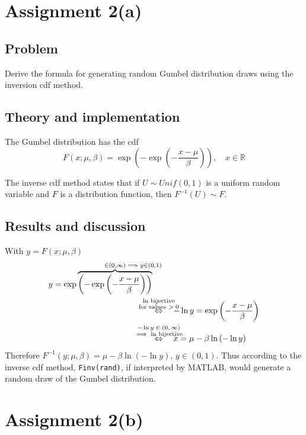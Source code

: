 \documentclass[11pt, a4paper]{article}
\begin{document}

\section{Assignment 2(a)}
\subsection{Problem}
Derive the formula for generating random Gumbel distribution draws using the inversion cdf method.
\subsection{Theory and implementation}
The Gumbel distribution has the cdf
$$ F(x; \mu, \beta) = \exp\left(-\exp\left(-\frac{x-\mu}\beta\right)\right), \quad x \in \mathbb{R} $$

The inverse cdf method states that if $U \sim Unif(0, 1)$ is a uniform random variable
and $F$ is a distribution function, then $F^{-1}(U) \sim F$.
\subsection{Results and discussion}
With $y=F(x; \mu, \beta)$
\begin{equation}
	\begin{split}
		y = \exp\overbrace{\left(-\exp\left(-\frac{x-\mu}{\beta}\right)\right)}^{\in \left(0, \infty\right) \mathrlap{\implies y \in \left(0, 1\right)}} &\\
		&\overset{\mathclap{\substack{\text{$\ln$ bijective} \\ \text{for values $>0$}}}}\Leftrightarrow \quad -\ln y = \exp\left(-\frac{x-\mu}{\beta}\right) \\
		&\overset{\mathclap{\substack{\text{$-\ln y \in \left(0, \infty\right)$} \\ \text{$\implies \ln$ bijective}}}}\Leftrightarrow \quad x = \mu - \beta \ln \left(-\ln y\right)
	\end{split}
\end{equation}
Therefore $F^{-1}(y; \mu, \beta) = \mu - \beta \ln \left(-\ln y\right), \, y \in (0, 1)$.
Thus according to the inverse cdf method, \verb|Finv(rand)|, if interpreted by MATLAB,
would generate a random draw of the Gumbel distribution.

\section{Assignment 2(b)}
\end{document}
